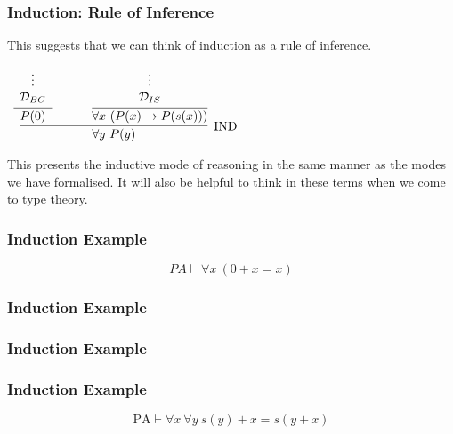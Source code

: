 \documentclass{beamer}
\theoremstyle{indentDefn} \newtheorem{defn}[]{Definition}
\begin{document}
\begin{frame}
	\frametitle{Induction: Rule of Inference}

	This suggests that we can think of induction as a rule of inference.

	\vspace{0.2cm}

		\begin{center}
			$\begin{array}{c}
				\infer[\IND]{\forall y \ P(y)}
						{\infer[]{P(0)}{\begin{array}{c} \vdots \\ \mathcal{D}_{BC}\end{array}} \hspace{0.3cm}
						&
						\hspace{0.3cm}
						\infer[]{\forall x \ (P(x) \to P(s(x)))}
							{\begin{array}{c} \vdots \\ \mathcal{D}_{IS}\end{array}}}
			\end{array}$
		\end{center}

	\vspace{0.2cm}

	This presents the inductive mode of reasoning in the same manner as the modes we have formalised. It will also be helpful to think in these terms when we come to type theory.
\end{frame}

\begin{frame}
	\frametitle{Induction Example}
	
	$$ PA \vdash \forall x \ (0 + x = x)$$
	
	\vspace{6cm}
	
\end{frame}

\begin{frame}
	\frametitle{Induction Example}

\end{frame}

\begin{frame}
	\frametitle{Induction Example}

	

\end{frame}

\begin{frame}
	\frametitle{Induction Example}
	$$\text{PA} \vdash \forall x \ \forall y \ s(y) + x = s(y+x)$$

	\vspace{6cm}	

\end{frame}
\end{document}
